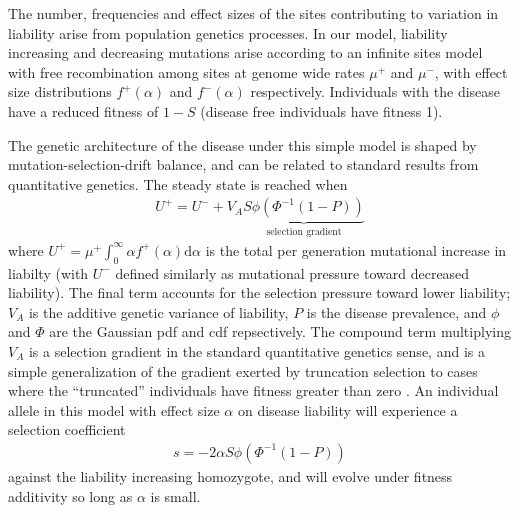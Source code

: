 \documentclass[11pt]{article}
\begin{document}
The number, frequencies and effect sizes of the sites contributing to variation in liability arise from population genetics processes. In our model, liability increasing and decreasing mutations arise according to an infinite sites model with free recombination among sites at genome wide rates $\mu^+$ and $\mu^-$, with effect size distributions $f^+\left(\alpha\right)$ and $f^-\left(\alpha\right)$ respectively. Individuals with the disease have a reduced fitness of $1-S$ (disease free individuals have fitness 1).

The genetic architecture of the disease under this simple model is shaped by mutation-selection-drift balance, and can be related to standard results from quantitative genetics. The steady state is reached when
\begin{align}
  U^+ = U^- + V_A \underbrace{S\phi\left(\Phi^{-1}\left(1-P\right)\right)}_{\text{selection gradient}}
  \label{univariate-bulk-eq}
\end{align}
where $U^+ = \mu^+\int_{0}^{\infty}\alpha f^+\left(\alpha\right)\mathrm{d}\alpha$ is the total per generation mutational increase in liabilty (with $U^-$ defined similarly as mutational pressure toward decreased liability). The final term accounts for the selection pressure toward lower liability; $V_A$ is the additive genetic variance of liability, $P$ is the disease prevalence, and $\phi$ and $\Phi$ are the Gaussian pdf and cdf repsectively. The compound term multiplying $V_A$ is a selection gradient in the standard quantitative genetics sense, and is a simple generalization of the gradient exerted by truncation selection to cases where the ``truncated'' individuals have fitness greater than zero  \cite{Charlesworth}.  An individual allele in this model with effect size $\alpha$ on disease liability will experience a selection coefficient
\begin{align}
  s = -2\alpha S\phi\left(\Phi^{-1}\left(1-P\right)\right)
  \label{sel-coef}
\end{align}
against the liability increasing homozygote, and will evolve under fitness additivity so long as $\alpha$ is small.
\end{document}
